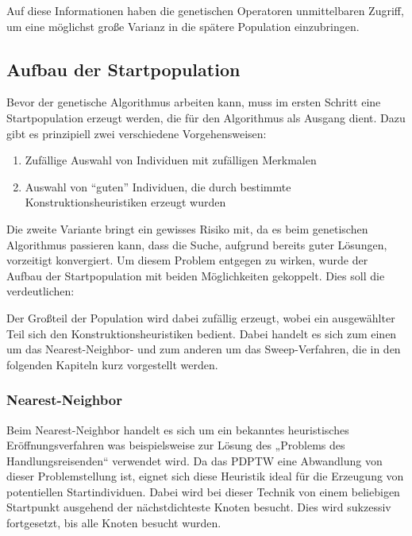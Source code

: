 
Auf diese Informationen haben die genetischen Operatoren unmittelbaren Zugriff, um eine möglichst große Varianz in die spätere Population einzubringen.

\subsection{Aufbau der Startpopulation}
Bevor der genetische Algorithmus arbeiten kann, muss im ersten Schritt eine Startpopulation erzeugt werden, die für den Algorithmus als Ausgang dient. Dazu gibt es prinzipiell zwei verschiedene Vorgehensweisen:

\begin{enumerate}
 \item Zufällige Auswahl von Individuen mit zufälligen Merkmalen
 \item Auswahl von "`guten"' Individuen, die durch bestimmte Konstruktionsheuristiken erzeugt wurden
\end{enumerate}

Die zweite Variante bringt ein gewisses Risiko mit, da es beim genetischen Algorithmus passieren kann, dass die Suche, aufgrund bereits guter Lösungen, vorzeitigt konvergiert. Um diesem Problem entgegen zu wirken, wurde der Aufbau der Startpopulation mit beiden Möglichkeiten gekoppelt. Dies soll die   verdeutlichen:


Der Großteil der Population wird dabei zufällig erzeugt, wobei ein ausgewählter Teil sich den Konstruktionsheuristiken bedient. Dabei handelt es sich zum einen um das Nearest-Neighbor- und zum anderen um das Sweep-Verfahren, die in den folgenden Kapiteln kurz vorgestellt werden.

\subsubsection{Nearest-Neighbor}
Beim Nearest-Neighbor handelt es sich um ein bekanntes heuristisches Eröffnungsverfahren was beispielsweise zur Lösung des „Problems des Handlungsreisenden“ verwendet wird. Da das PDPTW eine Abwandlung von dieser Problemstellung ist, eignet sich diese Heuristik ideal für die Erzeugung von potentiellen Startindividuen. Dabei wird bei dieser Technik von einem beliebigen Startpunkt ausgehend der nächstdichteste Knoten besucht. Dies wird sukzessiv fortgesetzt, bis alle Knoten besucht wurden. 


